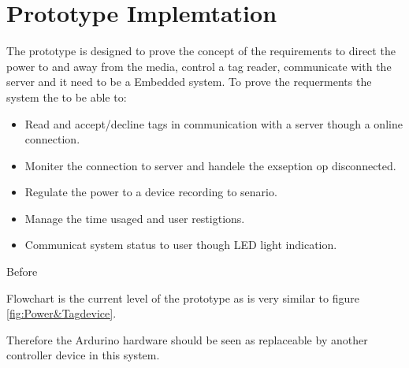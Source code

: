 \section{Prototype Implemtation}
The prototype is designed to prove the concept of the requirements to direct the power to and away from the media, control a tag reader, communicate with the server and it need to be a Embedded system. \newline
To prove the requerments the system the to be able to: 

\begin{itemize}
	\item Read and accept/decline tags in communication with a server though a online connection.
	\item Moniter the connection to server and handele the exseption op disconnected.
	\item Regulate the power to a device recording to senario.
	\item Manage the time usaged and user restigtions. 
	\item Communicat system status to user though LED light indication. 
\end{itemize}

Before  




Flowchart is the current level of the prototype as is very similar to figure \ref{fig:Power&Tagdevice}.

Therefore  the Ardurino hardware should be seen as replaceable by another controller device in this system. 




    